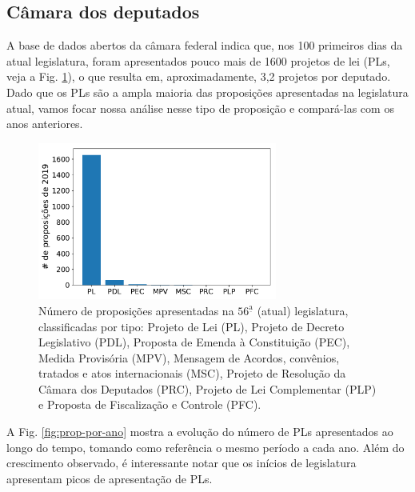 \documentclass[12pt,a4paper]{article}
\begin{document}
\subsection{Câmara dos deputados}

A base de dados abertos da câmara federal indica que, nos 100 primeiros dias da atual legislatura,
foram apresentados pouco mais de 1600 projetos de lei (PLs, veja a Fig. \ref{fig:prop-2019-tipo}),
o que resulta em, aproximadamente, 3,2 projetos por deputado. Dado que os PLs são a ampla maioria
das proposições apresentadas na legislatura atual, vamos focar nossa análise nesse tipo de proposição e
compará-las com os anos anteriores.

\begin{figure}[H]
\centering
\includegraphics[width=0.7\textwidth]{graficos/proposicoes-2019-por-tipo_2019-05-01.pdf}
\caption{Número de proposições apresentadas na $56^{\mathrm{\underline{a}}}$ (atual) legislatura,
  classificadas por tipo: Projeto de Lei (PL), Projeto de Decreto Legislativo (PDL),
  Proposta de Emenda à Constituição (PEC), Medida Provisória (MPV), Mensagem de Acordos,
  convênios, tratados e atos internacionais (MSC), Projeto de Resolução da Câmara dos Deputados (PRC),
  Projeto de Lei Complementar (PLP) e Proposta de Fiscalização e Controle (PFC).}
\label{fig:prop-2019-tipo}
\end{figure} 

A Fig. \ref{fig:prop-por-ano} mostra a evolução do número de PLs apresentados ao longo do tempo,
tomando como referência o mesmo período a cada ano. Além do crescimento observado, é interessante
notar que os inícios de legislatura apresentam picos de apresentação de PLs.
\end{document}
